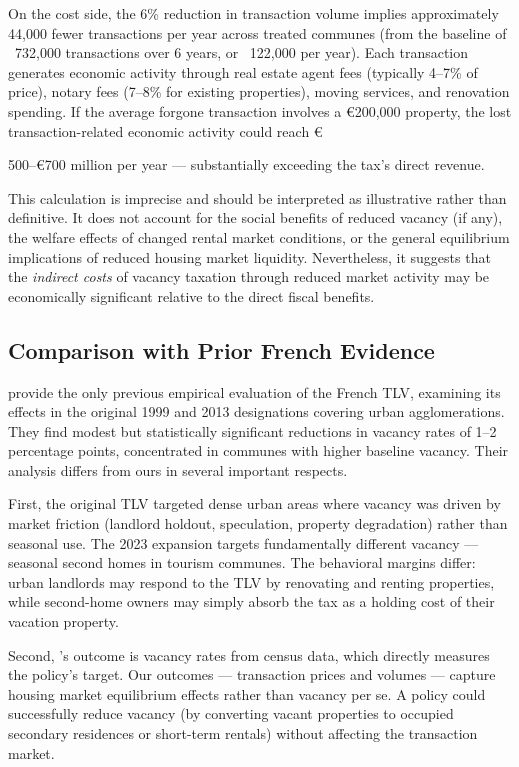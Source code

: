 \documentclass[12pt]{article}
\begin{document}
On the cost side, the 6\% reduction in transaction volume implies approximately 44,000 fewer transactions per year across treated communes (from the baseline of ~732,000 transactions over 6 years, or ~122,000 per year). Each transaction generates economic activity through real estate agent fees (typically 4--7\% of price), notary fees (7--8\% for existing properties), moving services, and renovation spending. If the average forgone transaction involves a \euro{200,000} property, the lost transaction-related economic activity could reach \euro{500--\euro{700} million per year --- substantially exceeding the tax's direct revenue.

This calculation is imprecise and should be interpreted as illustrative rather than definitive. It does not account for the social benefits of reduced vacancy (if any), the welfare effects of changed rental market conditions, or the general equilibrium implications of reduced housing market liquidity. Nevertheless, it suggests that the \textit{indirect costs} of vacancy taxation through reduced market activity may be economically significant relative to the direct fiscal benefits.

\subsection{Comparison with Prior French Evidence}

\citet{gravel2019} provide the only previous empirical evaluation of the French TLV, examining its effects in the original 1999 and 2013 designations covering urban agglomerations. They find modest but statistically significant reductions in vacancy rates of 1--2 percentage points, concentrated in communes with higher baseline vacancy. Their analysis differs from ours in several important respects.

First, the original TLV targeted dense urban areas where vacancy was driven by market friction (landlord holdout, speculation, property degradation) rather than seasonal use. The 2023 expansion targets fundamentally different vacancy --- seasonal second homes in tourism communes. The behavioral margins differ: urban landlords may respond to the TLV by renovating and renting properties, while second-home owners may simply absorb the tax as a holding cost of their vacation property.

Second, \citeauthor{gravel2019}'s outcome is vacancy rates from census data, which directly measures the policy's target. Our outcomes --- transaction prices and volumes --- capture housing market equilibrium effects rather than vacancy per se. A policy could successfully reduce vacancy (by converting vacant properties to occupied secondary residences or short-term rentals) without affecting the transaction market.

}
\end{document}
